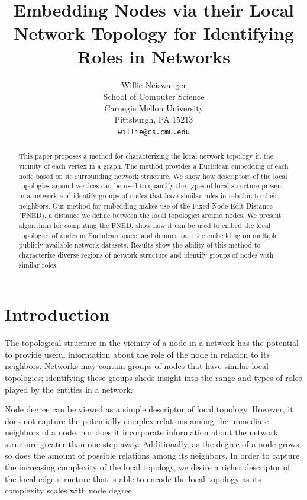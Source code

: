\documentclass{article}
\title{Embedding Nodes via their Local Network Topology for Identifying Roles in Networks}
\author{
Willie Neiswanger\\
School of Computer Science\\
Carnegie Mellon University\\
Pittsburgh, PA 15213 \\
\texttt{willie@cs.cmu.edu} \\
}
\begin{document}
\maketitle

\begin{abstract}
This paper proposes a method for characterizing the local network topology in the vicinity of each vertex in a graph. The method provides a Euclidean embedding of each node based on its surrounding network structure. We show how descriptors of the local topologies around vertices can be used to quantify the types of local structure present in a network and identify groups of nodes that have similar roles in relation to their neighbors. Our method for embedding makes use of the Fixed Node Edit Distance (FNED), a distance we define between the local topologies around nodes. We present algorithms for computing the FNED, show how it can be used to embed the local topologies of nodes in Euclidean space, and demonstrate the embedding on multiple publicly available network datasets. Results show the ability of this method to characterize diverse regions of network structure and identify groups of nodes with similar roles.
\end{abstract}


\section{Introduction}
\label{sec:intro}

The topological structure in the vicinity of a node in a network has the potential to provide useful information about the role of the node in relation to its neighbors. Networks may contain groups of nodes that have similar local topologies; identifying these groups sheds insight into the range and types of roles played by the entities in a network. %

Node degree can be viewed as a simple descriptor of local topology. However, it does not capture the potentially complex relations among the immediate neighbors of a node, nor does it incorporate information about the network structure greater than one step away. Additionally, as the degree of a node grows, so does the amount of possible relations among its neighbors. In order to capture the increasing complexity of the local topology, we desire a richer descriptor of the local edge structure that is able to encode the local topology as its complexity scales with node degree.
\end{document}
